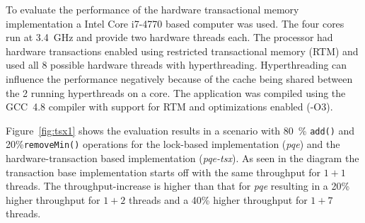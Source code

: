 To evaluate the performance of the hardware transactional memory implementation a Intel Core i7-4770 based computer was used. The four cores run at 3.4~GHz and provide two hardware threads each. The processor had hardware transactions enabled  using restricted transactional memory (RTM) and used all 8 possible hardware threads with hyperthreading. Hyperthreading can influence the performance negatively because of the cache being shared between the 2 running hyperthreads on a core. The application was compiled using the GCC~4.8 compiler with support for RTM and optimizations enabled (-O3).

Figure~\ref{fig:tsx1} shows the evaluation results in a scenario with 80~\% \texttt{add()} and 20\%\texttt{removeMin()} operations for the lock-based implementation (\textit{pqe}) and the hardware-transaction based implementation (\textit{pqe-tsx}). As seen in the diagram the transaction base implementation starts off with the same throughput for $1+1$ threads. The throughput-increase is higher than that for \textit{pqe} resulting in a 20\% higher throughput for $1+2$ threads and a 40\% higher throughput for $1+7$ threads.

